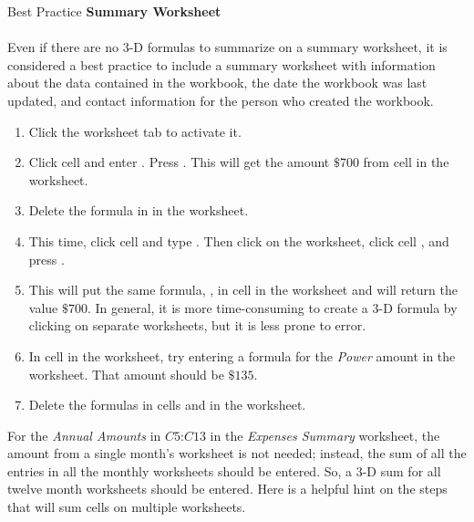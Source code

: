 \begin{center}
	\begin{infobox}{Best Practice}
		\textbf{Summary Worksheet}
		\\
		\\
		Even if there are no $ 3 $-D formulas to summarize on a summary worksheet, it is considered a best practice to include a summary worksheet with information about the data contained in the workbook, the date the workbook was last updated, and contact information for the person who created the workbook.
	\end{infobox}
\end{center}

\begin{enumerate}
	\item Click the  worksheet tab to activate it.
	\item Click cell  and enter . Press . This will get the amount $ \$700 $ from cell  in the  worksheet.
	\item Delete the formula in  in the  worksheet.
	\item This time, click cell  and type \fmtTyping{=}. Then click on the  worksheet, click cell , and press .
	\item This will put the same formula, , in cell  in the  worksheet and will return the value $ \$700 $. In general, it is more time-consuming to create a $ 3 $-D formula by clicking on separate worksheets, but it is less prone to error.
	\item In cell  in the  worksheet, try entering a formula for the \textit{Power} amount in the  worksheet. That amount should be $ \$135 $.
	\item Delete the formulas in cells  and  in the  worksheet.
\end{enumerate}

For the \textit{Annual Amounts} in $ C5 $:$ C13 $ in the \textit{Expenses Summary} worksheet, the amount from a single month's worksheet is not needed; instead, the sum of all the entries in all the monthly worksheets should be entered. So, a $ 3 $-D sum for all twelve month worksheets should be entered. Here is a helpful hint on the steps that will sum cells on multiple worksheets.

